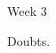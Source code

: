 \documentclass[handout, dvipsnames]{beamer}
\theoremstyle{definition}
\newtheorem{defn}[thm]{Definition}
\begin{document}
\begin{frame}{Week 3}
    \begin{tcolorbox}
        Doubts.
    \end{tcolorbox}
\end{frame}

\end{document}
